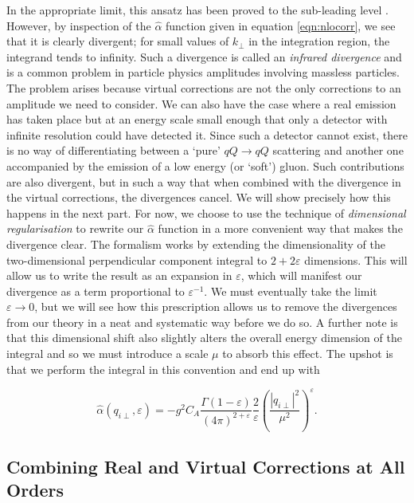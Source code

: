 In the appropriate limit, this ansatz has been proved to the sub-leading level \cite{Bogdan2006,Fadin2005,Fadin2004,Fadin2006}. However, by inspection of the $\hat{\alpha}$ function given in equation \ref{eqn:nlocorr}, we see that it is clearly divergent; for small values of $k_\perp$ in the integration region, the integrand tends to infinity. Such a divergence is called an \emph{infrared divergence} and is a common problem in particle physics amplitudes involving massless particles. The problem arises because virtual corrections are not the only corrections to an amplitude we need to consider. We can also have the case where a real emission has taken place but at an energy scale small enough that only a detector with infinite resolution could have detected it. Since such a detector cannot exist, there is no way of differentiating between a `pure' $qQ \to qQ$ scattering and another one accompanied by the emission of a low energy (or `soft') gluon. Such contributions are also divergent, but in such a way that when combined with the divergence in the virtual corrections, the divergences cancel. We will show precisely how this happens in the next part. For now, we choose to use the technique of \emph{dimensional regularisation} to rewrite our $\hat{\alpha}$ function in a more convenient way that makes the divergence clear. The formalism works by extending the dimensionality of the two-dimensional perpendicular component integral to $2 + 2 \varepsilon$ dimensions. This will allow us to write the result as an expansion in $\varepsilon$, which will manifest our divergence as a term proportional to $\varepsilon^{-1}$. We must eventually take the limit $\varepsilon \to 0$, but we will see how this prescription allows us to remove the divergences from our theory in a neat and systematic way before we do so. A further note is that this dimensional shift also slightly alters the overall energy dimension of the integral and so we must introduce a scale $\mu$ to absorb this effect. The upshot is that we perform the integral in this convention and end up with %

\begin{equation}
\hat{\alpha}(q_{i \perp}, \varepsilon) = - g^2 C_A \frac{\Gamma(1 - \varepsilon)}{(4 \pi)^{2 + \varepsilon}} \frac{2}{\varepsilon} \left(\frac{|q_{i \perp}|^2}{\mu^2} \right)^\varepsilon.
\end{equation}

\subsection{Combining Real and Virtual Corrections at All Orders}

